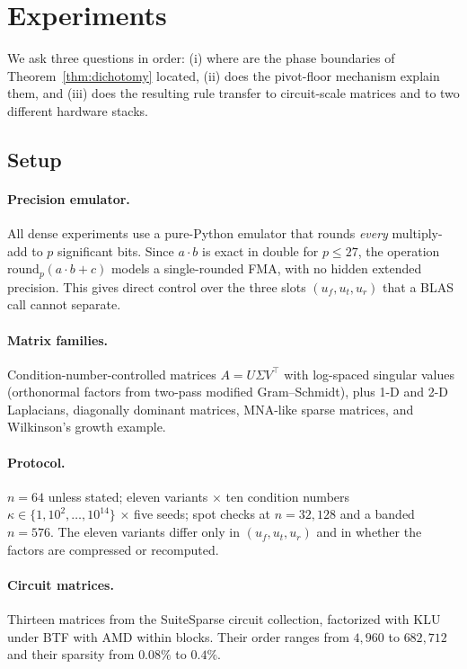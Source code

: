 
\section{Experiments}\label{sec:exp}

We ask three questions in order: (i) where are the phase boundaries of
Theorem~\ref{thm:dichotomy} located, (ii) does the pivot-floor mechanism explain
them, and (iii) does the resulting rule transfer to circuit-scale matrices and to
two different hardware stacks.

\subsection{Setup}

\paragraph{Precision emulator.}
All dense experiments use a pure-Python emulator that rounds \emph{every}
multiply-add to $p$ significant bits. Since $a\cdot b$ is exact in double for
$p\le27$, the operation $\mathrm{round}_p(a\cdot b+c)$ models a single-rounded
FMA, with no hidden extended precision. This gives direct control over the three
slots $(u_f,u_t,u_r)$ that a BLAS call cannot separate.

\paragraph{Matrix families.}
Condition-number-controlled matrices $A=U\Sigma V^{\top}$ with log-spaced
singular values (orthonormal factors from two-pass modified Gram--Schmidt), plus
1-D and 2-D Laplacians, diagonally dominant matrices, MNA-like sparse matrices,
and Wilkinson's growth example.

\paragraph{Protocol.}
$n=64$ unless stated; eleven variants $\times$ ten condition numbers
$\kappa\in\{1,10^{2},\dots,10^{14}\}$ $\times$ five seeds; spot checks at
$n=32,128$ and a banded $n=576$. The eleven variants differ only in
$(u_f,u_t,u_r)$ and in whether the factors are compressed or recomputed.

\paragraph{Circuit matrices.}
Thirteen matrices from the SuiteSparse circuit collection, factorized with KLU
under BTF with AMD within blocks. Their order ranges from $4{,}960$ to
$682{,}712$ and their sparsity from $0.08\%$ to $0.4\%$.


